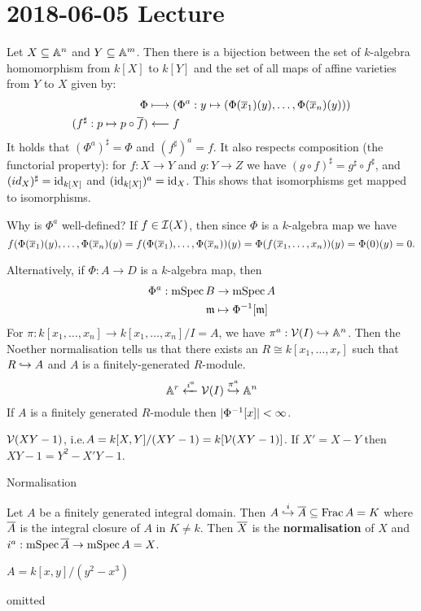 \section{2018-06-05 Lecture}

\begin{prop}[AG.15]
  Let $X \subseteq \mathbb{A}^n$ and $Y \subseteq \mathbb{A}^m$.
  Then there is a bijection between the set of $k$-algebra homomorphism from $k[X]$ to $k[Y]$ and the set of all maps of affine varieties from $Y$ to $X$ given by:
  \begin{align*}
    \Phi &\longmapsto (\Phi^a: y \mapsto (\Phi(\overline x_1)(y), \ldots, \Phi(\overline x_n)(y))) \\
    (f^\sharp: p \mapsto p \circ \overline f) &\longleftarrow f
  \end{align*}
  It holds that $(\Phi^a)^\sharp=\Phi$ and $(f^\sharp)^a=f$.
  It also respects composition (the functorial property): for $f: X \to Y $ and $g: Y \to Z$ we have $(g \circ f)^\sharp = g^\sharp \circ f^\sharp$, and $(id_X)^\sharp = \operatorname{id}_{k[X]}$ and $(\operatorname{id}_{k[X]})^a = \operatorname{id}_X$.
  This shows that isomorphisms get mapped to isomorphisms.
\end{prop}

\begin{rmk}
  Why is $\Phi^a$ well-defined?
  If $f \in \mathcal{I}(X)$, then since $\Phi$ is a $k$-algebra map we have
  \[ f(\Phi(\overline x_1)(y),\ldots,\Phi(\overline x_n)(y) = f(\Phi(\overline x_1),\ldots,\Phi(\overline x_n))(y) = \Phi(f(\overline x_1,\ldots,x_n))(y) = \Phi(0)(y) = 0. \]
\end{rmk}

\begin{rmk}
  Alternatively, if $\Phi: A \to D$ is a $k$-algebra map, then
  \begin{align*}
    \Phi^a: \operatorname{mSpec} B &\to \operatorname{mSpec} A \\
    \mathfrak{m} &\mapsto \Phi^{-1}[\mathfrak{m}]
  \end{align*}
  For $\pi: k[x_1,\ldots,x_n] \to k[x_1,\ldots,x_n]/I = A$, we have $\pi^a: \mathcal{V}(I) \hookrightarrow \mathbb{A}^n$.
  Then the Noether normalisation tells us that there exists an $R \cong k[x_1,\ldots,x_r]$ such that $R \hookrightarrow A$ and $A$ is a finitely-generated $R$-module.
  \[ \mathbb{A}^r \xleftarrow{i^a} \mathcal{V}(I) \overset{\pi^a}{\hookrightarrow} \mathbb{A}^n \]
  If $A$ is a finitely generated $R$-module then $|\Phi^{-1}[x]|<\infty$.
\end{rmk}

\begin{exam}
  $\mathcal{V}(XY-1)$, i.e.\@ $A=k[X,Y]/(XY-1) = k[\mathcal{V}(XY-1)]$.
  If $X'=X-Y$ then $XY-1 = Y^2-X'Y-1$.
\end{exam}

Normalisation

Let $A$ be a finitely generated integral domain.
Then $A \overset{i}{\hookrightarrow} \overline A \subseteq \operatorname{Frac} A = K$ where $\overline A$ is the integral closure of $A$ in $K \neq k$.
Then $\overline X$ is the \textbf{normalisation} of $X$ and $i^a: \operatorname{mSpec}\overline A \to \operatorname{mSpec} A = X$.

\begin{exam}
  $A=k[x,y]/(y^2-x^3)$

  omitted
\end{exam}

